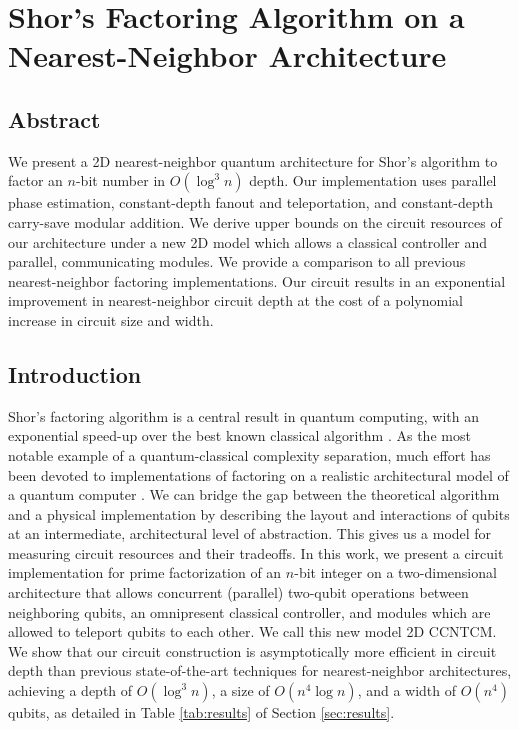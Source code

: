 \chapter {Shor's Factoring Algorithm on a Nearest-Neighbor Architecture}

\section{Abstract}
We present a 2D nearest-neighbor
quantum architecture for Shor's algorithm to factor an $n$-bit number in $O(\log^3n)$ depth.
Our implementation uses
parallel phase estimation,
constant-depth fanout and teleportation,
and
constant-depth carry-save modular addition.
We derive upper bounds on the circuit resources of our architecture under a
new 2D model which allows a classical controller and parallel, communicating
modules.
We provide a comparison to all previous nearest-neighbor factoring
implementations.  
Our circuit results in an exponential improvement in nearest-neighbor circuit depth at the cost of a polynomial increase in circuit size and width.

\section{Introduction}
\label{sec:intro}

Shor's factoring algorithm is a central result in quantum computing, with an
exponential speed-up over the best known classical algorithm \cite{Shor1994}.
As the most notable example of a quantum-classical complexity separation, much
effort has been devoted to implementations of factoring on a
realistic architectural model of a quantum computer
\cite{Beauregard2002,Kutin2006,VanMeter2006,VanMeter2005,VanMeterIL2005}.
We can bridge the gap between
the theoretical algorithm and a physical implementation by describing
the layout and interactions of qubits at an intermediate,
architectural level of abstraction.
This gives us a model for measuring circuit resources and their tradeoffs.
In this work, we present a circuit implementation for prime
factorization of an $n$-bit integer
on a two-dimensional architecture that allows concurrent (parallel) two-qubit operations
between neighboring qubits, an omnipresent classical controller, and
modules which are allowed to teleport qubits to each other. We call this new
model \textsc{2D CCNTCM}.
We show that our circuit construction is asymptotically more efficient in circuit depth than previous state-of-the-art techniques for nearest-neighbor
architectures, achieving a depth of $O(\log^3 n)$, a size of
$O(n^4\log n)$, and a width of $O(n^4)$ qubits, as detailed in Table
\ref{tab:results} of Section \ref{sec:results}.

